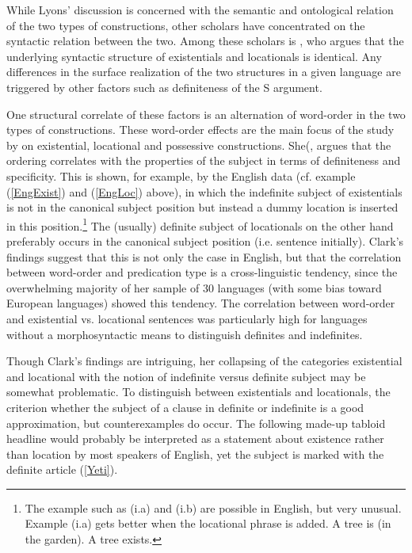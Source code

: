 While Lyons' discussion is concerned with the semantic and ontological relation of the two types of constructions, other scholars have concentrated on the syntactic relation between the two. 
Among these scholars is \citet{Freeze:1992}, who argues that the underlying syntactic structure of existentials and locationals is identical. 
Any differences in the surface realization of the two structures in a given language are triggered by other factors such as definiteness of the S argument.

One structural correlate of these factors is an alternation of word-order in the two types of constructions. 
These word-order effects are the main focus of the study by \citet{Clark:1978} on existential, locational and possessive constructions.
She(, argues that the ordering correlates with the properties of the subject in terms of definiteness and specificity.
This is shown, for example, by the English data (cf. example (\ref{EngExist}) and (\ref{EngLoc}) above), in which the indefinite subject of existentials is not in the canonical subject position but instead a dummy location is inserted in this position.\footnote{The example such as (i.a) and (i.b) are possible in English, but very unusual. Example (i.a) gets better when the locational phrase is added.
\eal
\ex A tree is (in the garden).
\ex A tree exists.
\zllast
}
The (usually) definite subject of locationals on the other hand preferably occurs in the canonical subject position (i.e. sentence initially).
Clark's findings suggest that this is not only the case in English, but that the correlation between word-order and predication type is a cross-linguistic tendency, since the overwhelming majority of her sample of 30 languages (with some bias toward European languages) showed this tendency. 
The correlation between word-order and existential vs. locational sentences was particularly high for languages without a morphosyntactic means to distinguish definites and indefinites.

Though Clark's findings are intriguing, her collapsing of the categories existential and locational with the notion of indefinite versus definite subject may be somewhat problematic. To distinguish between existentials and locationals, the criterion whether the subject of a clause in definite or indefinite is a good approximation, but counterexamples do occur. 
The following made-up tabloid headline would probably be interpreted as a statement about existence rather than location by most speakers of English, yet the subject is marked with the definite article (\ref{Yeti}).

